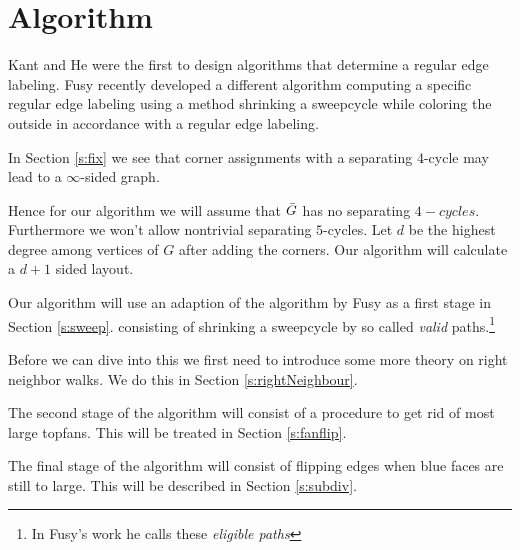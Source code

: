 
\section{Algorithm}

\label{s:algo}
Kant and He \cite{Kant1997} were the first to design algorithms that determine a regular edge labeling. Fusy \cite{Fusy2006} recently developed a different algorithm computing a specific regular edge labeling using a method shrinking a sweepcycle while coloring the outside in accordance with a regular edge labeling.

In Section \ref{s:fix} we see that corner assignments with a separating $4$-cycle may lead to a $\infty$-sided graph.


Hence for our algorithm we will assume that $\bar{G}$ has no separating $4-cycles$. Furthermore we won't allow nontrivial separating $5$-cycles. Let $d$ be the highest degree among vertices of $G$ after adding the corners. Our algorithm will calculate a $d+1$ sided layout.



Our algorithm will use an adaption of the algorithm by Fusy as a first stage in Section \ref{s:sweep}.  consisting of shrinking a sweepcycle by so called \emph{valid} paths.\footnote{In Fusy's work he calls these \emph{eligible paths}}

Before we can dive into this we first need to introduce some more theory on right neighbor walks. We do this in Section \ref{s:rightNeighbour}.

The second stage of the algorithm will consist of a procedure to get rid of most large topfans. This will be treated in Section \ref{s:fanflip}.

The final stage of the algorithm will consist of flipping edges when blue faces are still to large. This will be described in Section \ref{s:subdiv}.
